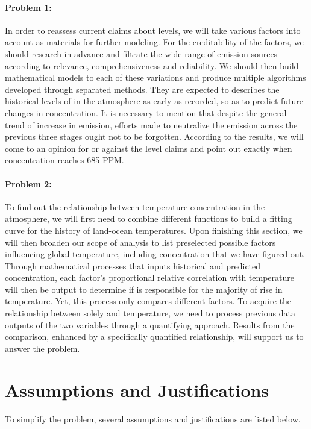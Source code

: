 \documentclass[12pt]{article}
\begin{document}
\paragraph{Problem 1:} In order to reassess current claims about  levels, we will take various factors into account as materials for further modeling. For the creditability of the factors, we should research in advance and filtrate the wide range of emission sources according to relevance, comprehensiveness and reliability. We should then build mathematical models to each of these variations and produce multiple algorithms developed through separated methods. They are expected to describes the historical levels of  in the atmosphere as early as recorded, so as to predict future changes in  concentration. It is necessary to mention that despite the general trend of increase in  emission, efforts made to neutralize the emission across the previous three stages ought not to be forgotten. According to the results, we will come to an opinion for or against the  level claims and point out exactly when  concentration reaches 685 PPM.

\paragraph{Problem 2:} To find out the relationship between temperature  concentration in the atmosphere, we will first need to combine different functions to build a fitting curve for the history of land-ocean temperatures. Upon finishing this section, we will then broaden our scope of analysis to list preselected possible factors influencing global temperature, including  concentration that we have figured out. Through mathematical processes that inputs historical and predicted concentration, each factor's proportional relative correlation with temperature will then be output to determine if  is responsible for the majority of rise in temperature. Yet, this process only compares different factors. To acquire the relationship between solely  and temperature, we need to process previous data outputs of the two variables through a quantifying approach. Results from the comparison, enhanced by a specifically quantified relationship, will support us to answer the problem. 

\section{Assumptions and Justifications}
To simplify the problem, several assumptions and justifications are listed below.
\end{document}

